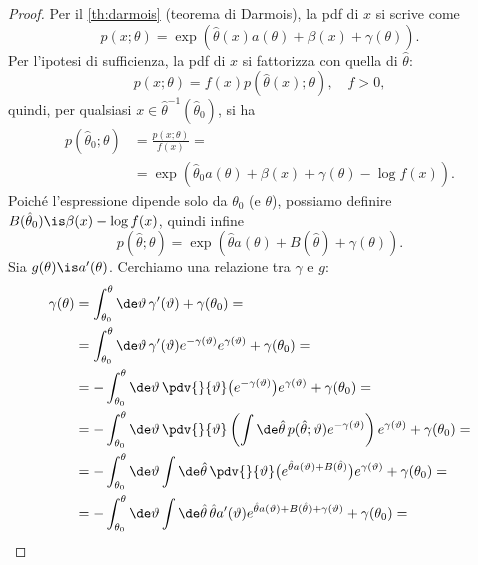 \begin{proof}
	Per il \autoref{th:darmois} (teorema di Darmois),
	la pdf di $x$ si scrive come
	\begin{equation*}
		p(x;\theta)
		= \exp \left( \hat\theta(x)a(\theta) + \beta(x) + \gamma(\theta) \right).
	\end{equation*}
	Per l'ipotesi di sufficienza, la pdf di $x$ si fattorizza con quella di $\hat\theta$:
	\begin{equation*}
		p(x;\theta)
		= f(x) p(\hat\theta(x);\theta), \quad f > 0,
	\end{equation*}
	quindi, per qualsiasi $x\in\hat\theta^{-1}(\hat\theta_0)$, si ha
	\begin{align*}
		p(\hat\theta_0;\theta)
		&= \frac{p(x;\theta)}{f(x)} = \\
		&= \exp \left( \hat\theta_0 a(\theta) + \beta(x) + \gamma(\theta) - \log f(x) \right).
	\end{align*}
	Poiché l'espressione dipende solo da $\theta_0$ (e $\theta$),
	possiamo definire $B(\hat\theta_0)\is\beta(x)-\log f(x)$,
	quindi infine
	\begin{equation*}
		p(\hat\theta;\theta)
		= \exp \left( \hat\theta a(\theta) + B(\hat\theta) + \gamma(\theta) \right).
	\end{equation*}
	Sia $g(\theta)\is a'(\theta)$.
	Cerchiamo una relazione tra $\gamma$ e $g$:
	\begin{align*}
		\gamma(\theta)
		&= \int_{\theta_0}^\theta \de\vartheta\, \gamma'(\vartheta) + \gamma(\theta_0) = \\
		&= \int_{\theta_0}^\theta \de\vartheta\,
		\gamma'(\vartheta) e^{-\gamma(\vartheta)} e^{\gamma(\vartheta)}
		+ \gamma(\theta_0) = \\
		&= - \int_{\theta_0}^\theta \de\vartheta\,
		\pdv{}{\vartheta}\big(e^{-\gamma(\vartheta)}\big) e^{\gamma(\vartheta)}
		+ \gamma(\theta_0) = \\
		&= - \int_{\theta_0}^\theta \de\vartheta\,
		\pdv{}{\vartheta} \left( \int\de\hat\theta\, p(\hat\theta;\vartheta) e^{-\gamma(\vartheta)} \right)
		e^{\gamma(\vartheta)} + \gamma(\theta_0) = \\
		&= - \int_{\theta_0}^\theta \de\vartheta \int\de\hat\theta\,
		\pdv{}{\vartheta} \big( e^{\hat\theta a(\vartheta) + B(\hat\theta)} \big) e^{\gamma(\vartheta)}
		+ \gamma(\theta_0) = \\
		&= - \int_{\theta_0}^\theta \de\vartheta \int\de\hat\theta\,
		\hat\theta a'(\vartheta) e^{\hat\theta a(\vartheta) + B(\hat\theta) + \gamma(\vartheta)}
		+ \gamma(\theta_0) = \\

\end{align*}
\end{proof}
